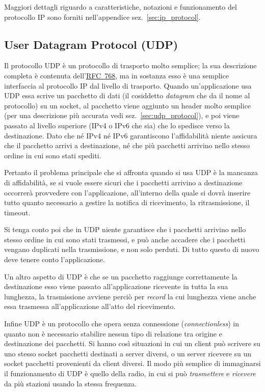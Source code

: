 Maggiori dettagli riguardo a caratteristiche, notazioni e funzionamento del
protocollo IP sono forniti nell'appendice sez.~\ref{sec:ip_protocol}.

 
\subsection{User Datagram Protocol (UDP)}
\label{sec:net_udp}

Il protocollo UDP è un protocollo di trasporto molto semplice; la sua
descrizione completa è contenuta
dell'\href{http://www.ietf.org/rfc/rfc0768.txt}{RFC~768}, ma in sostanza esso
è una semplice interfaccia al protocollo IP dal livello di trasporto. Quando
un'applicazione usa UDP essa scrive un pacchetto di dati (il cosiddetto
\textit{datagram} che da il nome al protocollo) su un socket, al pacchetto
viene aggiunto un header molto semplice (per una descrizione più accurata vedi
sez.~\ref{sec:udp_protocol}), e poi viene passato al livello superiore (IPv4 o
IPv6 che sia) che lo spedisce verso la destinazione.  Dato che né IPv4 né IPv6
garantiscono l'affidabilità niente assicura che il pacchetto arrivi a
destinazione, né che più pacchetti arrivino nello stesso ordine in cui sono
stati spediti.

Pertanto il problema principale che si affronta quando si usa UDP è la
mancanza di affidabilità, se si vuole essere sicuri che i pacchetti arrivino a
destinazione occorrerà provvedere con l'applicazione, all'interno della quale
si dovrà inserire tutto quanto necessario a gestire la notifica di
ricevimento, la ritrasmissione, il timeout. 

Si tenga conto poi che in UDP niente garantisce che i pacchetti arrivino nello
stesso ordine in cui sono stati trasmessi, e può anche accadere che i
pacchetti vengano duplicati nella trasmissione, e non solo perduti. Di tutto
questo di nuovo deve tenere conto l'applicazione.

Un altro aspetto di UDP è che se un pacchetto raggiunge correttamente la
destinazione esso viene passato all'applicazione ricevente in tutta la sua
lunghezza, la trasmissione avviene perciò per \textit{record} la cui lunghezza
viene anche essa trasmessa all'applicazione all'atto del ricevimento.

Infine UDP è un protocollo che opera senza connessione
(\textit{connectionless}) in quanto non è necessario stabilire nessun tipo di
relazione tra origine e destinazione dei pacchetti. Si hanno così situazioni
in cui un client può scrivere su uno stesso socket pacchetti destinati a
server diversi, o un server ricevere su un socket pacchetti provenienti da
client diversi.  Il modo più semplice di immaginarsi il funzionamento di UDP è
quello della radio, in cui si può \textsl{trasmettere} e \textsl{ricevere} da
più stazioni usando la stessa frequenza.

